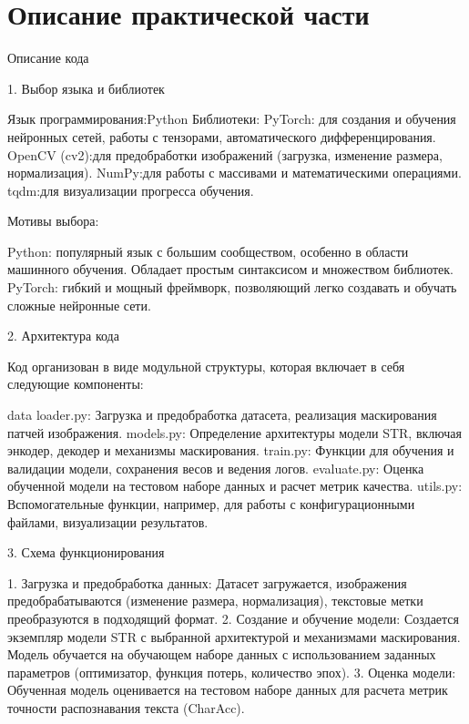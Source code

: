 \section{Описание практической части}
\label{sec:Chapter4} 

Описание кода

 1. Выбор языка и библиотек

Язык программирования:Python 
Библиотеки:
    PyTorch: для создания и обучения нейронных сетей, работы с тензорами, автоматического дифференцирования.
    OpenCV (cv2):для предобработки изображений (загрузка, изменение размера, нормализация).
    NumPy:для работы с массивами и математическими операциями.
    tqdm:для визуализации прогресса обучения.

Мотивы выбора:

Python: популярный язык  с  большим  сообществом,  особенно  в  области  машинного  обучения.  Обладает  простым  синтаксисом  и  множеством  библиотек. 
PyTorch: гибкий  и  мощный  фреймворк,  позволяющий  легко  создавать  и  обучать  сложные  нейронные  сети.

 2. Архитектура кода

Код  организован  в  виде  модульной  структуры,  которая  включает  в  себя  следующие  компоненты:

data  loader.py: Загрузка  и  предобработка  датасета,  реализация  маскирования  патчей  изображения.
models.py: Определение  архитектуры  модели  STR,  включая  энкодер,  декодер  и  механизмы  маскирования.
train.py: Функции  для  обучения  и  валидации  модели,  сохранения  весов  и  ведения  логов.
evaluate.py: Оценка  обученной  модели  на  тестовом  наборе  данных  и  расчет  метрик  качества.
utils.py: Вспомогательные  функции,  например,  для  работы  с  конфигурационными  файлами,  визуализации  результатов.

 3. Схема функционирования

1. Загрузка  и  предобработка  данных: Датасет  загружается,  изображения  предобрабатываются  (изменение  размера,  нормализация),  текстовые  метки  преобразуются  в  подходящий  формат. 
2. Создание  и  обучение  модели: Создается  экземпляр  модели  STR  с  выбранной  архитектурой  и  механизмами  маскирования.  Модель  обучается  на  обучающем  наборе  данных  с  использованием  заданных  параметров  (оптимизатор,  функция  потерь,  количество  эпох). 
3. Оценка  модели: Обученная  модель  оценивается  на  тестовом  наборе  данных  для  расчета  метрик  точности  распознавания  текста  (CharAcc). 

